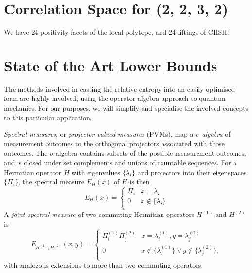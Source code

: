 \documentclass[10pt, a4paper]{article}
\newcommand{\?}{\mathrel{?}} %
\numberwithin{equation}{section} %
\theoremstyle{definition}
\theoremstyle{plain}
\theoremstyle{plain}
\begin{document}
    \section{Correlation Space for (2, 2, 3, 2)}

    We have 24 positivity facets of the local polytope, and 24 liftings of CHSH\@.

    \section{State of the Art Lower Bounds}

    The methods involved in casting the relative entropy into an easily optimised form are highly involved, using the operator algebra approach to quantum mechanics. For our purposes, we will simplify and specialise the involved concepts to this particular application.

    \emph{Spectral measures}, or \emph{projector-valued measures} (PVMs), map a \emph{\(\sigma\)-algebra} of measurement outcomes to the orthogonal projectors associated with those outcomes. The \(\sigma\)-algebra contains subsets of the possible measurement outcomes, and is closed under set complements and unions of countable sequences. For a Hermitian operator \(H\) with eigenvalues \(\{\lambda_i\}\) and projectors into their eigenspaces \(\{\Pi_i\}\), the spectral measure \(E_H(x)\) of \(H\) is then
    \[ E_H(x) = \begin{cases}
      \Pi_i & x = \lambda_i \\
      0 & x \not\in \{\lambda_i\} \\
    \end{cases} \]
    A \emph{joint spectral measure} of two commuting Hermitian operators \(H^{(1)}\) and \(H^{(2)}\) is
    \[ E_{H^{(1)},H^{(2)}}(x,y) = \begin{cases}
      \Pi_i^{(1)}\Pi_j^{(2)} & x = \lambda^{(1)}_i, y = \lambda^{(2)}_j\\
      0 & x \not\in \{\lambda^{(1)}_i\} \vee y \not\in \{\lambda^{(2)}_j\}, \\
    \end{cases} \]
    with analogous extensions to more than two commuting operators.

  
\end{document}
